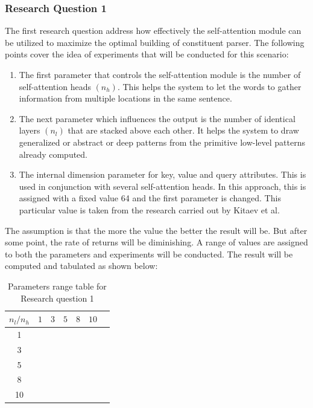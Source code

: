 \documentclass[a4paper, 11pt]{article}
\begin{document}
\subsubsection{Research Question 1}
The first research question address how effectively the self-attention module can be utilized to maximize the optimal building of constituent parser. The following points cover the idea of experiments that will be conducted for this scenario:
\begin{enumerate}
\item The first parameter that controls the self-attention module is the number of self-attention heads $(n_h)$. This helps the system to let the words to gather information from multiple locations in the same sentence. 
\item The next parameter which influences the output is the number of identical layers $(n_l)$ that are stacked above each other. It helps the system to draw generalized or abstract or deep patterns from the primitive low-level patterns already computed. 
\item The internal dimension parameter for key, value and query attributes. This is used in conjunction with several self-attention heads. In this approach, this is assigned with a fixed value 64 and the first parameter is changed. This particular value is taken from the research carried out by Kitaev et al. \parencite*{Kitaev2019}
\end{enumerate}

The assumption is that the more the value the better the result will be. But after some point, the rate of returns will be diminishing. A range of values are assigned to both the parameters and experiments will be conducted. The result will be computed and tabulated as shown below:

\begin{table}[h!]
  \begin{center}
    \begin{tabular}{c|c|c|c|c|c|c} 
      $n_l/n_h$ & $1$ & $3$ & $5$ & $8$ & $10$\\
      \hline
      1 & & & & & & \\
      \hline
      3 & & & & & \\
      \hline
      5 & & & & & \\
      \hline
      8 & & & & & \\
      \hline
      10 & & & & & \\
    \end{tabular}
    \caption{Parameters range table for Research question 1}
    \label{tab:research_question1_table1}

  \end{center}
\end{table}
\end{document}
